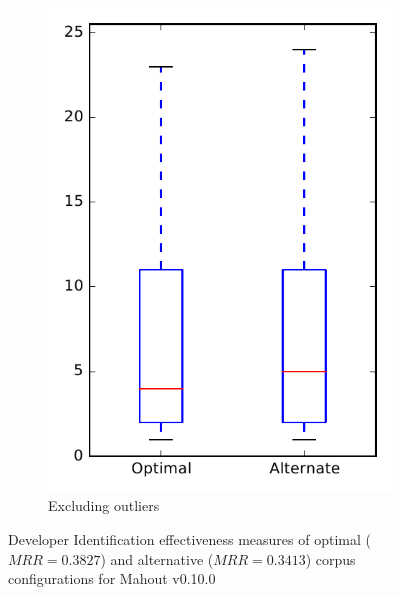 \begin{figure}
\begin{subfigure}{.4\textwidth}
        \includegraphics[height=0.4\textheight]{figures/combo/dit_rq2_mahout_no_outlier}
        \caption{Excluding outliers}\label{fig:combo:dit:rq2:mahout_no_outlier}
    \end{subfigure}
\caption[Developer Identification effectiveness measures of optimal and alternative corpus configurations for Mahout v0.10.0]%
{Developer Identification effectiveness measures of optimal ($MRR=0.3827$) and alternative ($MRR=0.3413$) corpus configurations for Mahout v0.10.0}
\label{fig:combo:dit:rq2:mahout}
\end{figure}
